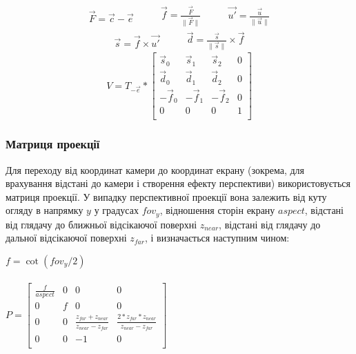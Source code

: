 \begin{equation}
  \begin{split}
    \vec{F} = \vec{c} - \vec{e}
  \end{split}
  \quad\quad
  \begin{split}
    \vec{f} = \frac{\vec F}{\|\vec{F}\|}
  \end{split}
  \quad\quad
  \begin{split}
    \vec{u'} = \frac{\vec u}{\|\vec{u}\|}
  \end{split}
\end{equation}
\begin{equation}
  \begin{split}
    \vec{s} = \vec{f} \times \vec{u'}
  \end{split}
  \quad\quad
  \begin{split}
    \vec{d} = \frac{\vec s}{\|\vec{s}\|} \times \vec{f}
  \end{split}
\end{equation}
\begin{equation}
  V = T_{-\vec{e}} * \begin{bmatrix}
    \vec{s}_0 & \vec{s}_1 & \vec{s}_2 & 0 \\
    \vec{d}_0 & \vec{d}_1 & \vec{d}_2 & 0 \\
    -\vec{f}_0 & -\vec{f}_1 & -\vec{f}_2 & 0 \\
    0 & 0 & 0 & 1 \\
  \end{bmatrix}
\end{equation}

\subsubsection{Матриця проекції}

Для переходу від координат камери до координат екрану (зокрема, для врахування відстані до камери і створення ефекту перспективи) використовується матриця проекції. У випадку перспективної проекції вона залежить від куту огляду в напрямку $y$ у градусах $\mathit{fov_y}$, відношення сторін екрану $\mathit{aspect}$, відстані від глядачу до ближньої відсікаючої поверхні $\mathit{z_{near}}$, відстані від глядачу до дальної відсікаючої поверхні $z_{far}$, і визначається наступним чином:

\begin{center}
  $f = \operatorname{cot}(\mathit{fov_y} / 2)$ \\~\\
  $P = \begin{bmatrix}
    \frac{f}{\mathit{aspect}} & 0 & 0 & 0 \\
    0 & f & 0 & 0 \\
    0 & 0 & \frac{\mathit{z_{far}}+\mathit{z_{near}}}{\mathit{z_{near}}-\mathit{z_{far}}}
      & \frac{2*\mathit{z_{far}}*\mathit{z_{near}}}{\mathit{z_{near}}-\mathit{z_{far}}} \\
    0 & 0 & -1 & 0 \\
  \end{bmatrix}$
\end{center}

